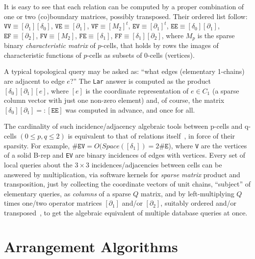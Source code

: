 \documentclass{juliacon}
\begin{document}
It is easy to see that each relation can be computed by a proper combination of one or two (co)boundary matrices, possibly transposed. Their ordered list follow: $\texttt{VV}\equiv[\partial_1][\delta_0]$, $\texttt{VE}\equiv[\partial_1]$, $\texttt{VF}\equiv[M_2]^t$, $\texttt{EV}\equiv[\partial_1]^t$, $\texttt{EE}\equiv[\delta_0][\partial_1]$, $\texttt{EF}\equiv[\partial_2]$, $\texttt{FV}\equiv[M_2]$, $\texttt{FE}\equiv[\delta_1]$, $\texttt{FF}\equiv[\delta_1][\partial_2]$, where $M_p$ is the sparse binary \emph{characteristic matrix} of $p$-cells, that holds by rows the images of characteristic functions of $p$-cells as subsets of $0$-cells (vertices).

A typical topological query may be asked as: ``what edges (elementary 1-chains) are adjacent to edge $e$?''
The \texttt{Lar} answer is computed as the product $[\delta_0][\partial_1][e]$, where $[e]$ is the coordinate representation of $e\in C_1$ (a sparse column vector with just one non-zero element) and, of course, the matrix $[\delta_0][\partial_1] =: [\texttt{EE}]$ was computed in advance, and once for all.

The cardinality of such incidence/adjacency algebraic tools between p-cells and q-cells $(0\leq p,q \leq 2)$ is equivalent to that of relations itself~\cite{Woo:85}, in force of their sparsity.  For example, $\#\texttt{EV} = O(Space([\delta_1]) = 2\#\texttt{E}$), where \texttt{V} are the vertices of a solid B-rep and \texttt{EV} are binary incidences of edges with vertices. Every set of local queries about the $3\times 3$ incidences/adjacencies between cells can be answered by multiplication, via software kernels for \emph{sparse matrix} product and transposition, just by collecting the coordinate vectors of unit chains, ``subject''  of elementary queries, as \emph{columns} of a sparse $Q$ matrix, and by left-multiplying $Q$ times one/two operator matrices $[\partial_1]$ and/or $[\partial_2]$, suitably ordered and/or transposed~\cite{Dicarlo:2014:TNL:2543138.2543294}, to get the algebraic equivalent of multiple database queries at once.

\section{Arrangement Algorithms}
\end{document}
